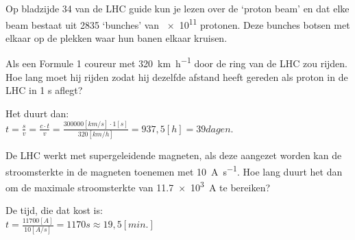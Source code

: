 \begin{questions}
\question
Op bladzijde 34 van de LHC guide kun je lezen over de `proton beam' en dat elke beam bestaat
uit 2835 `bunches' van \SI{e11}{} protonen. Deze bunches botsen met elkaar op de plekken waar
hun banen elkaar kruisen.

\question
Als een Formule 1 coureur met \SI{320}{\kilo\meter\per\hour} door de ring van de
LHC zou rijden. Hoe lang moet hij rijden zodat hij dezelfde afstand heeft gereden als
proton in de LHC in 1 s aflegt?

\begin{solution}
Het duurt dan: \\
$t = \frac{s}{v} = \frac{c\cdot t}{v} = \frac{ 300000 [km/s] \cdot 1 [s]}{320 [km/h]} = 937,5 [h] = 39 dagen.$
\end{solution}

\question
De LHC werkt met supergeleidende magneten, als deze aangezet worden kan de stroomsterkte
in de magneten toenemen met \SI{10}{\ampere\per\second}. Hoe lang duurt het dan om
de maximale stroomsterkte van \SI{11,7e3}{\ampere} te bereiken?

\begin{solution}
De tijd, die dat kost is: \\
$t = \frac{11700 [A]}{10 [A/s]} = 1170 s \approx 19,5 [min.]$
\end{solution}


\end{questions}
